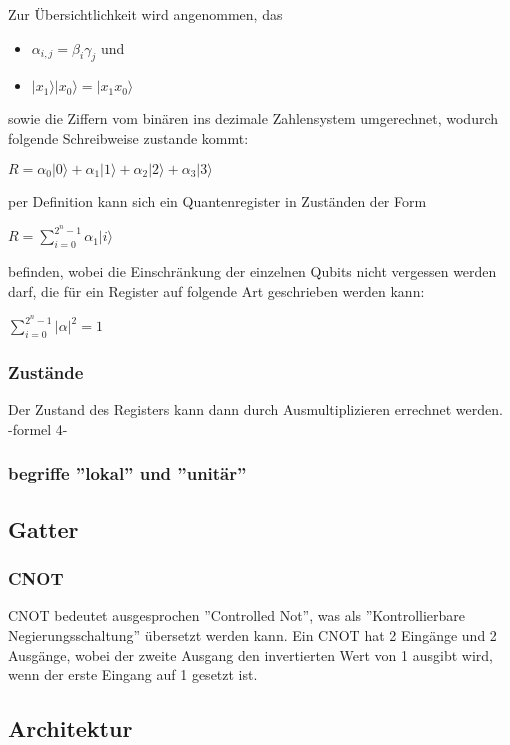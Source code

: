 Zur Übersichtlichkeit wird angenommen, das
\begin{itemize}
	\item $\alpha_{i,j} = \beta_i\gamma_j$ und
	\item $|x_1\rangle|x_0\rangle = |x_1 x_0\rangle$
\end{itemize}
sowie die Ziffern vom binären ins dezimale Zahlensystem umgerechnet, wodurch folgende Schreibweise zustande kommt:

$R = \alpha_0|0\rangle+\alpha_1|1\rangle+\alpha_2|2\rangle+\alpha_3|3\rangle$

per Definition kann sich ein Quantenregister in Zuständen der Form

$R = \displaystyle\sum_{i=0}^{2^n-1} \alpha_1|i\rangle$

befinden, wobei die Einschränkung der einzelnen Qubits nicht vergessen werden darf, die für ein Register auf folgende Art geschrieben werden kann:

$\displaystyle\sum_{i=0}^{2^n-1}  |\alpha|^2 = 1$

\subsubsection{Zustände}

Der Zustand des Registers kann dann durch Ausmultiplizieren errechnet werden. -formel 4-

\subsubsection{begriffe ''lokal'' und ''unitär''}

\subsection{Gatter}
\label{sec:Gatter}

\subsubsection{CNOT}

CNOT bedeutet ausgesprochen ''Controlled Not'', was als ''Kontrollierbare Negierungsschaltung'' übersetzt werden kann.
Ein CNOT hat 2 Eingänge und 2 Ausgänge, wobei der zweite Ausgang den invertierten Wert von 1 ausgibt wird, wenn der erste Eingang auf 1 gesetzt ist.

\subsection{Architektur}
\label{sec:Architektur}

